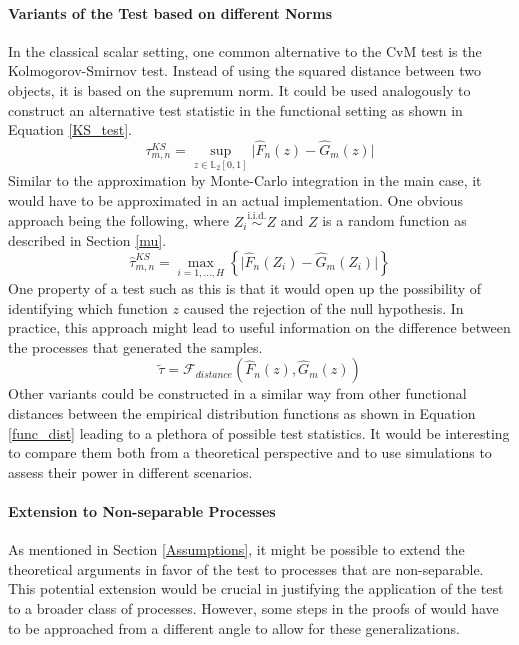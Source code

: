 \documentclass[12pt, a4paper]{article}
\theoremstyle{MAstyle} \newtheorem{assumption}{Assumption}[section]
\theoremstyle{MAstyle} \newtheorem{definition}{Definition}[section]
\theoremstyle{MAstyle} \newtheorem{theorem}{Theorem}[section]
\begin{document}
			\paragraph{Variants of the Test based on different Norms\\}
			In the classical scalar setting, one common alternative to the CvM test is the Kolmogorov-Smirnov test. Instead of using the squared distance between two objects, it is based on the supremum norm. It could be used analogously to construct an alternative test statistic in the functional setting as shown in Equation \ref{KS_test}. 
			\begin{equation}\label{KS_test}
				\tau^{\textit{KS}}_{m,n} = \sup_{z \in \mathbb{L}_2[0,1]} \vert \hat{F}_n(z) - \hat{G}_m(z) \vert
			\end{equation}
			Similar to the approximation by Monte-Carlo integration in the main case, it would have to be approximated in an actual implementation. One obvious approach being the following, where $Z_i \stackrel{\text{i.i.d.}}{\sim} Z$ and $Z$ is a random function as described in Section \ref{mu}.
			\begin{equation}
				\hat{\tau}^{\textit{KS}}_{m,n} = \max_{i = 1, \dots, H}\left\{\vert \hat{F}_n(Z_i) - \hat{G}_m(Z_i) \vert \right\}
			\end{equation}
			One property of a test such as this is that it would open up the possibility of identifying which function $z$ caused the rejection of the null hypothesis. In practice, this approach might lead to useful information on the difference between the processes that generated the samples.
			\begin{equation}\label{func_dist}
				\tilde{\tau} = \mathcal{F}_{\textit{distance}}\left(\hat{F}_n(z), \hat{G}_m(z)\right)
			\end{equation}
			Other variants could be constructed in a similar way from other functional distances between the empirical distribution functions as shown in Equation \ref{func_dist} leading to a plethora of possible test statistics. It would be interesting to compare them both from a theoretical perspective and to use simulations to assess their power in different scenarios.
			
			\newpage
			\paragraph{Extension to Non-separable Processes\\}
			As mentioned in Section \ref{Assumptions}, it might be possible to extend the theoretical arguments in favor of the test to processes that are non-separable. This potential extension would be crucial in justifying the application of the test to a broader class of processes. However, some steps in the proofs of \cite{bugni_permutation_2021} would have to be approached from a different angle to allow for these generalizations.
			
\end{document}
